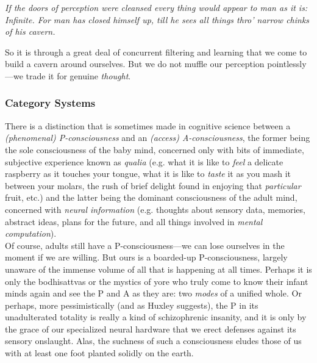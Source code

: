 \begin{displayquote}
	\textit{If the doors of perception were cleansed every thing would appear to man as it is: Infinite. For man has closed himself up, till he sees all things thro' narrow chinks of his cavern. \\}
\end{displayquote}

So it is through a great deal of concurrent filtering and learning that we come to build a cavern around ourselves. But we do not muffle our perception pointlessly---we trade it for genuine \textit{thought}.

\subsubsection{Category Systems}

There is a distinction that is sometimes made in cognitive science between a \textit{(phenomenal) P-consciousness} and an \textit{(access) A-consciousness}, the former being the sole consciousness of the baby mind, concerned only with bits of immediate, subjective experience known as \textit{qualia} (e.g. what it is like to \textit{feel} a delicate raspberry as it touches your tongue, what it is like to \textit{taste} it as you mash it between your molars, the rush of brief delight found in enjoying that \textit{particular} fruit, etc.) and the latter being the dominant consciousness of the adult mind, concerned with \textit{neural information} (e.g. thoughts about sensory data, memories, abstract ideas, plans for the future, and all things involved in \textit{mental computation}). \\

Of course, adults still have a P-consciousness---we can lose ourselves in the moment if we are willing. But ours is a boarded-up P-consciousness, largely unaware of the immense volume of all that is happening at all times. Perhaps it is only the bodhisattvas or the mystics of yore who truly come to know their infant minds again and see the P and A as they are: two \textit{modes} of a unified whole. Or perhaps, more pessimistically (and as Huxley suggests), the P in its unadulterated totality is really a kind of schizophrenic insanity, and it is only by the grace of our specialized neural hardware that we erect defenses against its sensory onslaught. Alas, the suchness of such a consciousness eludes those of us with at least one foot planted solidly on the earth. \\\\

